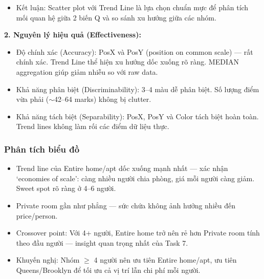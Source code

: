 \begin{itemize}
\begin{itemize}
    \end{itemize}
    \item Kết luận: Scatter plot với Trend Line là lựa chọn chuẩn mực để phân tích mối quan hệ giữa 2 biến Q và so sánh xu hướng giữa các nhóm.
\end{itemize}

\textbf{2. Nguyên lý hiệu quả (Effectiveness):}

\begin{itemize}
    \item Độ chính xác (Accuracy): PosX và PosY (position on common scale) --- rất chính xác. Trend Line thể hiện xu hướng dốc xuống rõ ràng. MEDIAN aggregation giúp giảm nhiễu so với raw data.
    \item Khả năng phân biệt (Discriminability): 3--4 màu dễ phân biệt. Số lượng điểm vừa phải ($\sim$42--64 marks) không bị clutter.
    \item Khả năng tách biệt (Separability): PosX, PosY và Color tách biệt hoàn toàn. Trend lines không làm rối các điểm dữ liệu thực.
\end{itemize}

\subsubsection{Phân tích biểu đồ}

\begin{itemize}
    \item Trend line của Entire home/apt dốc xuống mạnh nhất --- xác nhận `economies of scale': càng nhiều người chia phòng, giá mỗi người càng giảm. Sweet spot rõ ràng ở 4--6 người.
    \item Private room gần như phẳng --- sức chứa không ảnh hưởng nhiều đến price/person.
    \item Crossover point: Với 4+ người, Entire home trở nên rẻ hơn Private room tính theo đầu người --- insight quan trọng nhất của Task 7.
    \item Khuyến nghị: Nhóm $\geq$ 4 người nên ưu tiên Entire home/apt, ưu tiên Queens/Brooklyn để tối ưu cả vị trí lẫn chi phí mỗi người.
\end{itemize}
